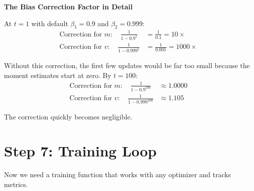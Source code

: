 \documentclass[../../main.tex]{subfiles}
\begin{document}
\begin{important}
\textbf{The Bias Correction Factor in Detail}

At $t=1$ with default $\beta_1 = 0.9$ and $\beta_2 = 0.999$:
\begin{align*}
    \text{Correction for } m: \quad \frac{1}{1 - 0.9^1} &= \frac{1}{0.1} = 10\times \\
    \text{Correction for } v: \quad \frac{1}{1 - 0.999^1} &= \frac{1}{0.001} = 1000\times
\end{align*}

Without this correction, the first few updates would be far too small because the moment estimates start at zero. By $t=100$:
\begin{align*}
    \text{Correction for } m: \quad \frac{1}{1 - 0.9^{100}} &\approx 1.0000 \\
    \text{Correction for } v: \quad \frac{1}{1 - 0.999^{100}} &\approx 1.105
\end{align*}

The correction quickly becomes negligible.
\end{important}

\section{Step 7: Training Loop}
\label{sec:capstone-training}

Now we need a training function that works with any optimizer and tracks metrics.
\end{document}
